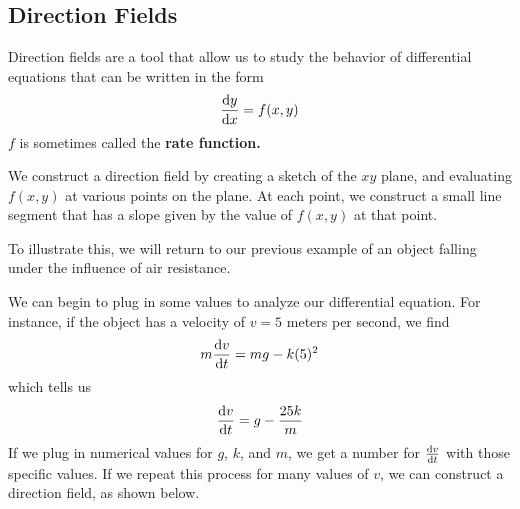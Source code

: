 \subsection{Direction Fields}
Direction fields are a tool that allow us to study the behavior of differential equations that can be written in the form
\[ \dv{y}{x} = f(x, y) \]
$f$ is sometimes called the \bf{rate function}. \par
We construct a direction field by creating a sketch of the $xy$ plane, and evaluating $f(x,y)$ at various points on the plane. At each point, we construct a small line segment that has a slope given by the value of $f(x,y)$ at that point. \par
To illustrate this, we will return to our previous example of an object falling under the influence of air resistance. 
\begin{example}
    We can begin to plug in some values to analyze our differential equation. For instance, if the object has a velocity of $v = 5$ meters per second, we find
    \[ m\dv{v}{t} = mg - k(5)^2 \]
    which tells us
    \[ \dv{v}{t} = g - \frac{25k}{m} \]
    If we plug in numerical values for $g$, $k$, and $m$, we get a number for $\dv{v}{t}$ with those specific values. If we repeat this process for many values of $v$, we can construct a direction field, as shown below. \par
    \begin{figure}[h!]
        \centering
\end{figure}
\end{example}
